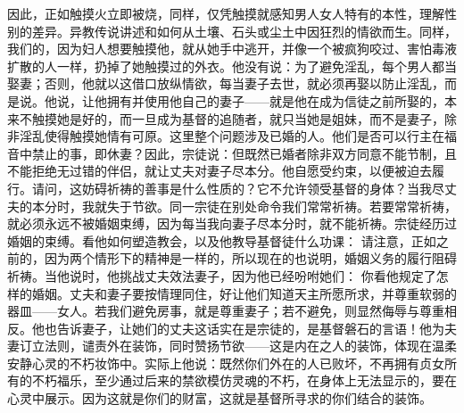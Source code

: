 因此，正如触摸火立即被烧，同样，仅凭触摸就感知男人女人特有的本性，理解性别的差异。异教传说讲述和如何从土壤、石头或尘土中因狂烈的情欲而生。同样，我们的，因为妇人想要触摸他，就从她手中逃开，并像一个被疯狗咬过、害怕毒液扩散的人一样，扔掉了她触摸过的外衣。他没有说：为了避免淫乱，每个男人都当娶妻；否则，他就以这借口放纵情欲，每当妻子去世，就必须再娶以防止淫乱，而是说。他说，让他拥有并使用他自己的妻子——就是他在成为信徒之前所娶的，本来不触摸她是好的，而一旦成为基督的追随者，就只当她是姐妹，而不是妻子，除非淫乱使得触摸她情有可原。这里整个问题涉及已婚的人。他们是否可以行主在福音中禁止的事，即休妻？因此，宗徒说：但既然已婚者除非双方同意不能节制，且不能拒绝无过错的伴侣，就让丈夫对妻子尽本分。他自愿受约束，以便被迫去履行。请问，这妨碍祈祷的善事是什么性质的？它不允许领受基督的身体？当我尽丈夫的本分时，我就失于节欲。同一宗徒在别处命令我们常常祈祷。若要常常祈祷，就必须永远不被婚姻束缚，因为每当我向妻子尽本分时，就不能祈祷。宗徒经历过婚姻的束缚。看他如何塑造教会，以及他教导基督徒什么功课： 请注意，正如之前的，因为两个情形下的精神是一样的，所以现在的也说明，婚姻义务的履行阻碍祈祷。当他说时，他挑战丈夫效法妻子，因为他已经吩咐她们： 你看他规定了怎样的婚姻。丈夫和妻子要按情理同住，好让他们知道天主所愿所求，并尊重软弱的器皿——女人。若我们避免房事，就是尊重妻子；若不避免，则显然侮辱与尊重相反。他也告诉妻子，让她们的丈夫这话实在是宗徒的，是基督磐石的言语！他为夫妻订立法则，谴责外在装饰，同时赞扬节欲——这是内在之人的装饰，体现在温柔安静心灵的不朽妆饰中。实际上他说：既然你们外在的人已败坏，不再拥有贞女所有的不朽福乐，至少通过后来的禁欲模仿灵魂的不朽，在身体上无法显示的，要在心灵中展示。因为这就是你们的财富，这就是基督所寻求的你们结合的装饰。\par

